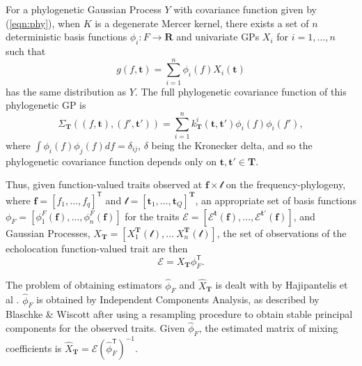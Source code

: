 \documentclass{ws-rv9x6}
\begin{document}
For a phylogenetic Gaussian Process \(Y\) with covariance function given by (\ref{eqn:phy}), when \(K\) is a degenerate Mercer kernel, there exists a set of \(n\) deterministic basis functions \(\phi_i: F \to \mathbf{R}\) and univariate GPs \(X_i\) for \(i = 1,\dots, n\) such that 
\[
g(f, \mathbf{t}) = \sum_{i = 1}^{n} \phi_i(f) X_i(\mathbf{t})
\] 
has the same distribution as \(Y\). The full phylogenetic covariance function of this phylogenetic GP is
\[
\Sigma_{\mathbf{T}}((f, \mathbf{t}), (f', \mathbf{t}')) = \sum_{i = 1}^{n}  k_{\mathbf{T}}^i(\mathbf{t}, \mathbf{t}') \phi_i(f) \phi_i(f'),
\]
where \(\int \phi_i(f) \phi_j(f) df = \delta_{ij}\), \(\delta\) being the Kronecker delta, and so the phylogenetic covariance function depends only on \(\mathbf{t}, \mathbf{t}' \in \mathbf{T}\). 

Thus, given function-valued traits observed at \(\mathbf{f} \times \mathcal{t}\) on the frequency-phylogeny, where \(\mathbf{f} = [f_1, \dots, f_q]^{\mathsf{T}}\) and \(\mathcal{t} = [\mathbf{t}_1, \dots, \mathbf{t}_Q]^{\mathbf{T}}\), an appropriate set of basis functions \(\phi_{F} = [\phi^{F}_1(\mathbf{f}), \dots, \phi^{F}_n(\mathbf{f})]\) for the traits \(\mathcal{E} = [\mathcal{E}^{\mathbf{t}}(\mathbf{f}), \dots, \mathcal{E}^{\mathbf{t}'}(\mathbf{f})]\), and Gaussian Processes, \(X_{\mathbf{T}} = [X_1^{\mathbf{T}}(\mathcal{t}), \dots\ X_n^{\mathbf{T}}(\mathcal{t})]\), the set of observations of the echolocation function-valued trait are then 
\begin{equation}
\mathcal{E} = X_{\mathbf{T}} \phi_F^{\mathsf{T}}.
\label{eqn:inv}
\end{equation}

The problem of obtaining estimators \(\hat{\phi}_F\) and \(\hat{X}_{\mathbf{T}}\) is dealt with by Hajipantelis et al \cite{hadjipantelis2013function}. \(\hat{\phi}_F\) is obtained by Independent Components Analysis, as described by Blaschke \& Wiscott \cite{blaschke2004cubica} after using a resampling procedure to obtain stable principal components for the observed traits. Given \(\hat{\phi}_F\), the estimated matrix of mixing coefficients is \(\hat{X}_{\mathbf{T}} = \mathcal{E} (\hat{\phi}_F^{\mathsf{T}})^{-1}\). 
\end{document}
